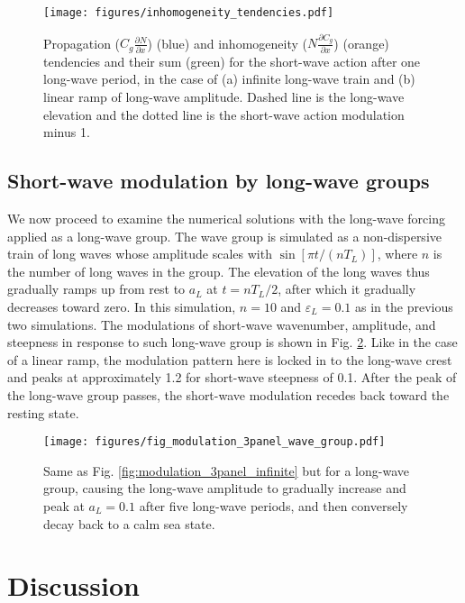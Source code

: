 \documentclass[lineno]{jfm}
\begin{document}
\begin{figure}
  \centering
  \texttt{[image: figures/inhomogeneity\_tendencies.pdf]}
  \caption{
    Propagation ($C_g \frac{\partial N}{\partial x}$) (blue) and inhomogeneity
    ($N \frac{\partial C_g}{\partial x}$) (orange) tendencies and their sum
    (green) for the short-wave action after one long-wave period, in the case of
    (a) infinite long-wave train and (b) linear ramp of long-wave amplitude.
    Dashed line is the long-wave elevation and the dotted line is the short-wave
    action modulation minus 1.
  }
  \label{fig:inhomogeneity_tendencies}
\end{figure}

\subsection{Short-wave modulation by long-wave groups}
\label{subsection:wave_groups}

We now proceed to examine the numerical solutions with the long-wave forcing
applied as a long-wave group.
The wave group is simulated as a non-dispersive train of long waves whose
amplitude scales with $\sin[\pi t / (n T_L)]$, where $n$ is the number of
long waves in the group.
The elevation of the long waves thus gradually ramps up from rest to $a_L$ at
$t = n T_L / 2$, after which it gradually decreases toward zero.
In this simulation, $n = 10$ and $\varepsilon_L = 0.1$ as in the previous two
simulations.
The modulations of short-wave wavenumber, amplitude, and steepness in response
to such long-wave group is shown in Fig. \ref{fig:modulation_3panel_groups}.
Like in the case of a linear ramp, the modulation pattern here is locked in to
the long-wave crest and peaks at approximately 1.2 for short-wave steepness of 0.1.
After the peak of the long-wave group passes, the short-wave modulation recedes
back toward the resting state.

\begin{figure}
\centering
\texttt{[image: figures/fig\_modulation\_3panel\_wave\_group.pdf]}
\caption{
  Same as Fig. \ref{fig:modulation_3panel_infinite} but for a long-wave group,
  causing the long-wave amplitude to gradually increase and peak at $a_L = 0.1$
  after five long-wave periods, and then conversely decay back to a calm sea state.
}
\label{fig:modulation_3panel_groups}
\end{figure}

\section{Discussion}
\label{section:discussion}
\end{document}
